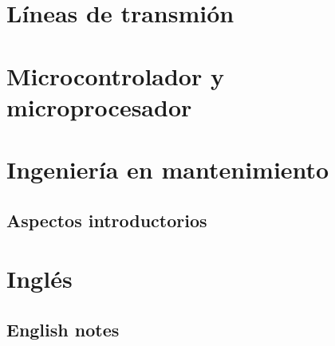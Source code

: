 \documentclass[
	11pt, %
	fleqn, %
	a4paper, %
]{LegrandOrangeBook}
\begin{document}
\part{Líneas de transmión}


\part{Microcontrolador y microprocesador}

\part{Ingeniería en mantenimiento}
\chapter{Aspectos introductorios}
\part{Inglés}
\chapter{English notes}
\end{document}
